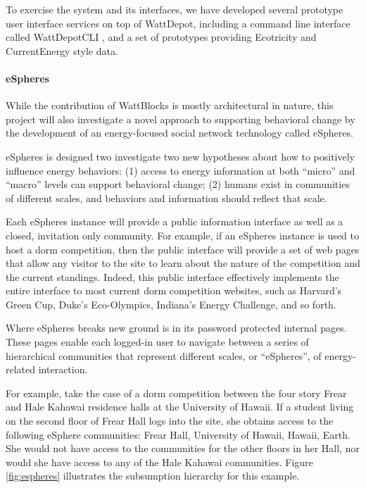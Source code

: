 To exercise the system
and its interfaces, we have developed several prototype user interface
services on top of WattDepot, including a command line interface called
WattDepotCLI \cite{WattDepotCLI}, and a set of prototypes providing Ecotricity and
CurrentEnergy style data.  




\paragraph{eSpheres}

While the contribution of WattBlocks is mostly architectural in nature,
this project will also investigate a novel approach to supporting
behavioral change by the development of an energy-focused social network
technology called eSpheres.

eSpheres is designed two investigate two new hypotheses about how to
positively influence energy behaviors: (1) access to energy information at
both ``micro'' and ``macro'' levels can support behavioral change; (2)
humans exist in communities of different scales, and behaviors and
information should reflect that scale.

Each eSpheres instance will provide a public information interface as well
as a closed, invitation only community.  For example, if an eSpheres
instance is used to host a dorm competition, then the public interface will
provide a set of web pages that allow any visitor to the site to learn
about the nature of the competition and the current standings.  Indeed,
this public interface effectively implements the entire interface to most
current dorm competition websites, such as Harvard's Green Cup, Duke's
Eco-Olympics, Indiana's Energy Challenge, and so forth. 

Where eSpheres breaks new ground is in its password protected internal
pages.  These pages enable each logged-in user to navigate between a series
of hierarchical communities that represent different scales, or
``eSpheres'', of energy-related interaction.

For example, take the case of a dorm competition between the four story
Frear and Hale Kahawai residence halls at the University of Hawaii. If a
student living on the second floor of Frear Hall logs into the site, she
obtains access to the following eSphere communities: Frear Hall, University
of Hawaii, Hawaii, Earth.  She would not have access to the communities for
the other floors in her Hall, nor would she have access to any of the Hale
Kahawai communities.  Figure \ref{fig:espheres} illustrates the subsumption
hierarchy for this example.

